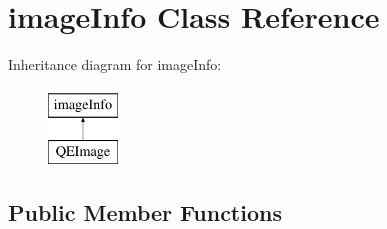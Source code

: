 \hypertarget{classimageInfo}{
\section{imageInfo Class Reference}
\label{classimageInfo}
}
Inheritance diagram for imageInfo:\begin{figure}[H]
\begin{center}
\leavevmode
\includegraphics[height=2.000000cm]{classimageInfo}
\end{center}
\end{figure}
\subsection*{Public Member Functions}
